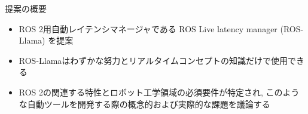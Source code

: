 

\begin{frame}{提案の概要}
    \begin{itemize}
        \item ROS 2用自動レイテンシマネージャである ROS Live latency manager (ROS-Llama) を提案
        \item ROS-Llamaはわずかな努力とリアルタイムコンセプトの知識だけで使用できる
        \item ROS 2の関連する特性とロボット工学領域の必須要件が特定され, このような自動ツールを開発する際の概念的および実際的な課題を議論する
    \end{itemize}
\end{frame}
